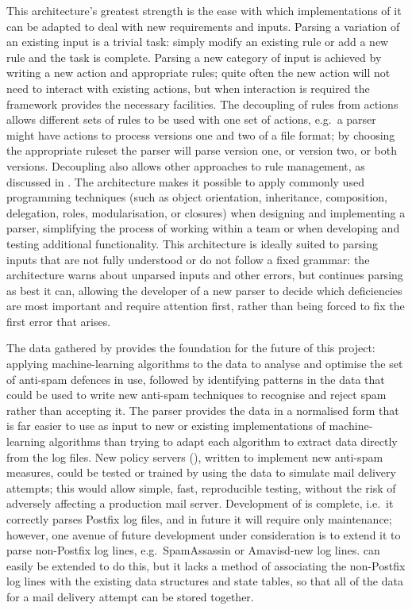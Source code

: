 This architecture's greatest strength is the ease with which
implementations of it can be adapted to deal with new requirements and
inputs.  Parsing a variation of an existing input is a trivial task: simply
modify an existing rule or add a new rule and the task is complete.
Parsing a new category of input is achieved by writing a new action and
appropriate rules; quite often the new action will not need to interact
with existing actions, but when interaction is required the framework
provides the necessary facilities.  The decoupling of rules from actions
allows different sets of rules to be used with one set of actions, e.g.\ a
parser might have actions to process versions one and two of a file format;
by choosing the appropriate ruleset the parser will parse version one, or
version two, or both versions.  Decoupling also allows other approaches to
rule management, as discussed in .  The architecture makes it possible to apply commonly used
programming techniques (such as object orientation, inheritance,
composition, delegation, roles, modularisation, or closures) when designing
and implementing a parser, simplifying the process of working within a team
or when developing and testing additional functionality.  This architecture
is ideally suited to parsing inputs that are not fully understood or do not
follow a fixed grammar: the architecture warns about unparsed inputs and
other errors, but continues parsing as best it can, allowing the developer
of a new parser to decide which deficiencies are most important and require
attention first, rather than being forced to fix the first error that
arises.

The data gathered by \parsername{} provides the foundation for the future
of this project: applying machine-learning algorithms to the data to
analyse and optimise the set of anti-spam defences in use, followed by
identifying patterns in the data that could be used to write new anti-spam
techniques to recognise and reject spam rather than accepting it.  The
parser provides the data in a normalised form that is far easier to use as
input to new or existing implementations of machine-learning algorithms
than trying to adapt each algorithm to extract data directly from the log
files.  New policy servers (), written to
implement new anti-spam measures, could be tested or trained by using the
data to simulate mail delivery attempts; this would allow simple, fast,
reproducible testing, without the risk of adversely affecting a production
mail server.  Development of \parsername{} is complete, i.e.\ it correctly
parses Postfix log files, and in future it will require only maintenance;
however, one avenue of future development under consideration is to extend
it to parse non-Postfix log lines, e.g.\ SpamAssassin or Amavisd-new log
lines.  \parsername{} can easily be extended to do this, but it lacks a
method of associating the non-Postfix log lines with the existing data
structures and state tables, so that all of the data for a mail delivery
attempt can be stored together.

